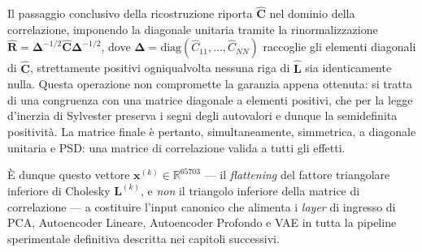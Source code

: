 Il passaggio conclusivo della ricostruzione riporta $\hat{\mathbf{C}}$ nel dominio della correlazione, imponendo la diagonale unitaria tramite la rinormalizzazione $\hat{\mathbf{R}} = \boldsymbol{\Delta}^{-1/2} \hat{\mathbf{C}} \boldsymbol{\Delta}^{-1/2}$, dove $\boldsymbol{\Delta} = \text{diag}(\hat{C}_{11}, \dots, \hat{C}_{NN})$ raccoglie gli elementi diagonali di $\hat{\mathbf{C}}$, strettamente positivi ogniqualvolta nessuna riga di $\hat{\mathbf{L}}$ sia identicamente nulla. Questa operazione non compromette la garanzia appena ottenuta: si tratta di una congruenza con una matrice diagonale a elementi positivi, che per la legge d'inerzia di Sylvester preserva i segni degli autovalori e dunque la semidefinita positività. La matrice finale è pertanto, simultaneamente, simmetrica, a diagonale unitaria e PSD: una matrice di correlazione valida a tutti gli effetti.

È dunque questo vettore $\mathbf{x}^{(k)} \in \mathbb{R}^{65703}$ --- il \emph{flattening} del fattore triangolare inferiore di Cholesky $\mathbf{L}^{(k)}$, e \emph{non} il triangolo inferiore della matrice di correlazione --- a costituire l'input canonico che alimenta i \emph{layer} di ingresso di PCA, Autoencoder Lineare, Autoencoder Profondo e VAE in tutta la pipeline sperimentale definitiva descritta nei capitoli successivi.